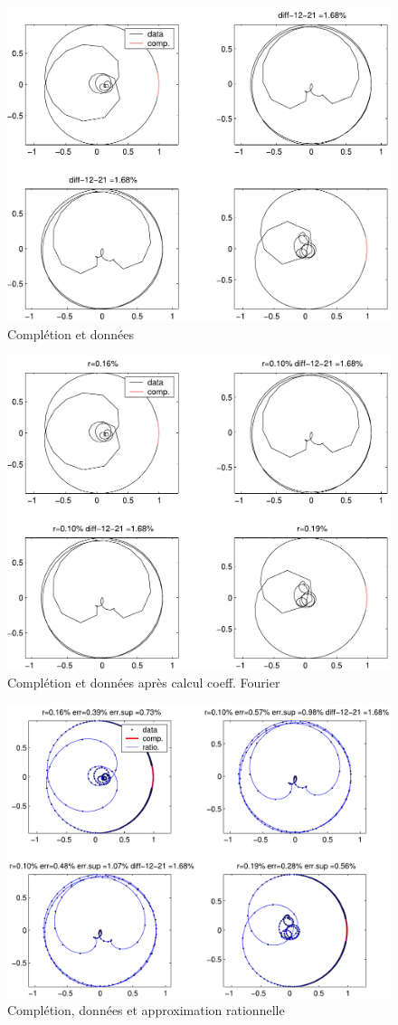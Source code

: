 \documentclass[12]{article}
\begin{document}
  
\begin{figure}
\begin{center}
\includegraphics[width=0.8\linewidth]{Spbc.pdf}
\end{center}
\caption{Compl\'etion et donn\'ees}
\label{Spbc:fig}
\end{figure}
 
\begin{figure}
\begin{center}
\includegraphics[width=0.8\linewidth]{Spbcfou.pdf}
\end{center}
\caption{Compl\'etion et donn\'ees apr\`es calcul coeff. Fourier}
\label{Spbcfou:fig}
\end{figure}

\begin{figure}
\begin{center}
\includegraphics[width=0.8\linewidth]{Spbr.pdf}
\end{center}
\caption{Compl\'etion, donn\'ees et approximation rationnelle}
\label{Spbr:fig}
\end{figure}
        
   
\end{document}

